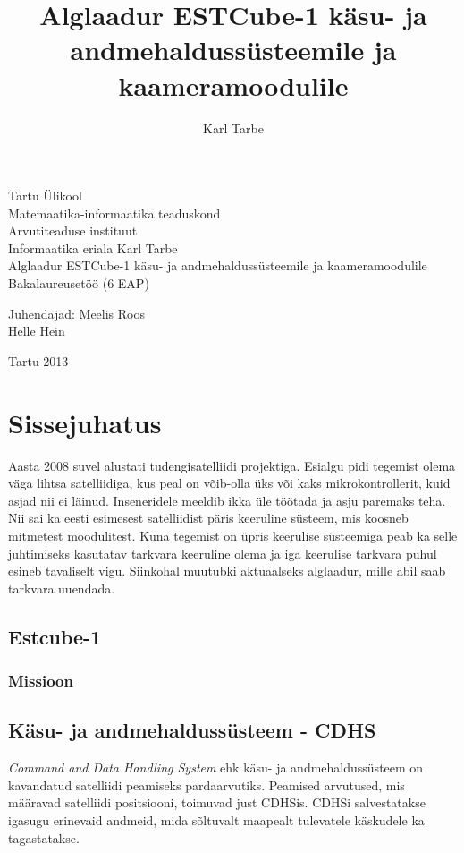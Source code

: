 \documentclass[12pt,a4paper]{article}
\title{Alglaadur ESTCube-1 käsu- ja andmehaldussüsteemile ja kaameramoodulile}
\author{Karl Tarbe}
\begin{document}
\begin{titlepage}
\begin{center}
Tartu Ülikool\\
Matemaatika-informaatika teaduskond\\
Arvutiteaduse instituut\\
Informaatika eriala
\vfill
Karl Tarbe\\[1cm]
Alglaadur ESTCube-1 käsu- ja andmehaldussüsteemile ja kaameramoodulile\\[4mm]
Bakalaureusetöö (6 EAP)
\vspace{2cm}
\begin{flushright}
	Juhendajad: Meelis Roos\\
	Helle Hein
\end{flushright}
\vfill
Tartu 2013
\end{center}
\end{titlepage}
\tableofcontents

\section{Sissejuhatus}
Aasta 2008 suvel alustati tudengisatelliidi projektiga. Esialgu pidi tegemist
olema väga lihtsa satelliidiga, kus peal on võib-olla üks või kaks
mikrokontrollerit, kuid asjad nii ei läinud. Inseneridele meeldib ikka üle
töötada ja asju paremaks teha. Nii sai ka eesti esimesest satelliidist päris
keeruline süsteem, mis koosneb mitmetest moodulitest. Kuna tegemist on üpris
keerulise süsteemiga peab ka selle juhtimiseks kasutatav tarkvara keeruline
olema ja iga keerulise tarkvara puhul esineb tavaliselt vigu. Siinkohal muutubki
aktuaalseks alglaadur, mille abil saab tarkvara uuendada.

\subsection{Estcube-1}
\subsubsection{Missioon}
\subsection{Käsu- ja andmehaldussüsteem - CDHS}
\textit{Command and Data Handling System} ehk käsu- ja andmehaldussüsteem on
kavandatud satelliidi peamiseks pardaarvutiks. Peamised arvutused, mis määravad
satelliidi positsiooni, toimuvad just CDHSis. CDHSi salvestatakse igasugu
erinevaid andmeid, mida sõltuvalt maapealt tulevatele käskudele ka tagastatakse.
\end{document}

